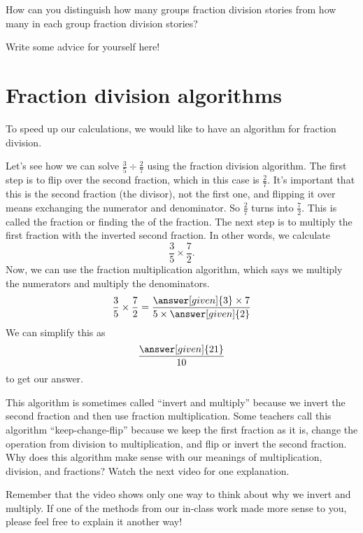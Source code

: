 \documentclass{ximera}
\begin{document}
\begin{question}
How can you distinguish how many groups fraction division stories from how many in each group fraction division stories?
\begin{freeResponse}
Write some advice for yourself here!
\end{freeResponse}
\end{question}







\section{Fraction division algorithms}

To speed up our calculations, we would like to have an algorithm for fraction division. 

\begin{example}
Let's see how we can solve $\frac{3}{5} \div \frac{2}{7}$ using the fraction division algorithm. The first step is to flip over the second fraction, which in this case is $\frac{2}{7}$. It's important that this is the second fraction (the divisor), not the first one, and flipping it over means exchanging the numerator and denominator. So $\frac{2}{7}$ turns into $\frac{7}{2}$. This is called  the fraction or finding the  of the fraction. The next step is to multiply the first fraction with the inverted second fraction. In other words, we calculate
\[
\frac{3}{5} \times \frac{7}{2}.
\]
Now, we can use the fraction multiplication algorithm, which says we multiply the numerators and multiply the denominators.
\[
\frac{3}{5} \times \frac{7}{2} = \frac{\answer[given]{3} \times 7}{5 \times \answer[given]{2}}
\]
We can simplify this as
\[
\frac{\answer[given]{21}}{10}
\]
to get our answer.
\end{example}

This algorithm is sometimes called ``invert and multiply'' because we invert the second fraction and then use fraction multiplication. Some teachers call this algorithm ``keep-change-flip'' because we keep the first fraction as it is, change the operation from division to multiplication, and flip or invert the second fraction. Why does this algorithm make sense with our meanings of multiplication, division, and fractions? Watch the next video for one explanation.


Remember that the video shows only one way to think about why we invert and multiply. If one of the methods from our in-class work made more sense to you, please feel free to explain it another way!
\end{document}

